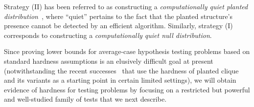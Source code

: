 \documentclass{article}
\begin{document}
Strategy (II) has been referred to as constructing a \emph{computationally quiet planted distribution}~\cite{sk-cert}, where ``quiet'' pertains to the fact that the planted structure's presence cannot be detected by an efficient algorithm. Similarly, strategy (I) corresponds to constructing a \emph{computationally quiet null distribution}.

Since proving lower bounds for average-case hypothesis testing problems based on standard hardness assumptions is an elusively difficult goal at present (notwithstanding the recent successes~\cite{BBH-reductions,secret-leakage} that use the hardness of planted clique and its variants as a starting point in certain limited settings), we will obtain evidence of hardness for testing problems by focusing on a restricted but powerful and well-studied family of tests that we next describe. 
\end{document}
